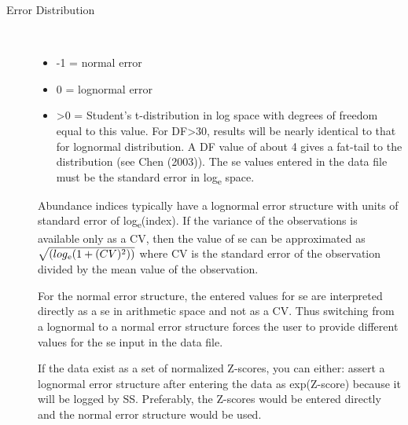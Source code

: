 \begin{description}
	\item[Error Distribution]\
	\begin{itemize}
		\item -1 = normal error
		\item  0 = lognormal error 
		\item >0 = Student's t-distribution in log space with degrees of freedom equal to this value.  For DF>30, results will be nearly identical to that for lognormal distribution.  A DF value of about 4 gives a fat-tail to the distribution (see Chen (2003)).  The se values entered in the data file must be the standard error in log\textsubscript{e} space.
	\end{itemize}
Abundance indices typically have a lognormal error structure with units of standard error of log\textsubscript{e}(index).  If the variance of the observations is available only as a CV, then the value of se can be approximated as $\sqrt{(log\textsubscript{e}(1+(CV)\textsuperscript{2}))}$ where CV is the standard error of the observation divided by the mean value of the observation.

For the normal error structure, the entered values for se are interpreted directly as a se in arithmetic space and not as a CV.  Thus switching from a lognormal to a normal error structure forces the user to provide different values for the se input in the data file.

If the data exist as a set of normalized Z-scores, you can either:  assert a lognormal error structure after entering the data as exp(Z-score) because it will be logged by SS.  Preferably, the Z-scores would be entered directly and the normal error structure would be used.
\end{description}

